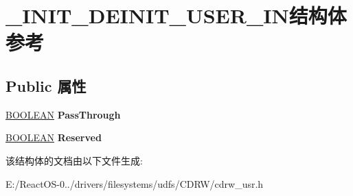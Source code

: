 \hypertarget{struct___i_n_i_t___d_e_i_n_i_t___u_s_e_r___i_n}{}\section{\+\_\+\+I\+N\+I\+T\+\_\+\+D\+E\+I\+N\+I\+T\+\_\+\+U\+S\+E\+R\+\_\+\+I\+N结构体 参考}
\label{struct___i_n_i_t___d_e_i_n_i_t___u_s_e_r___i_n}
\subsection*{Public 属性}
\begin{DoxyCompactItemize}
\item 
\mbox{\label{struct___i_n_i_t___d_e_i_n_i_t___u_s_e_r___i_n_a7c7a5263a6ea773ea033ab9ab4101a1d}} 
\hyperlink{_processor_bind_8h_a112e3146cb38b6ee95e64d85842e380a}{B\+O\+O\+L\+E\+AN} {\bfseries Pass\+Through}
\item 
\mbox{\label{struct___i_n_i_t___d_e_i_n_i_t___u_s_e_r___i_n_aea1594a20c58ac683928e0add4f2aed2}} 
\hyperlink{_processor_bind_8h_a112e3146cb38b6ee95e64d85842e380a}{B\+O\+O\+L\+E\+AN} {\bfseries Reserved}
\end{DoxyCompactItemize}


该结构体的文档由以下文件生成\+:\begin{DoxyCompactItemize}
\item 
E\+:/\+React\+O\+S-\/0../drivers/filesystems/udfs/\+C\+D\+R\+W/cdrw\+\_\+usr.\+h\end{DoxyCompactItemize}
